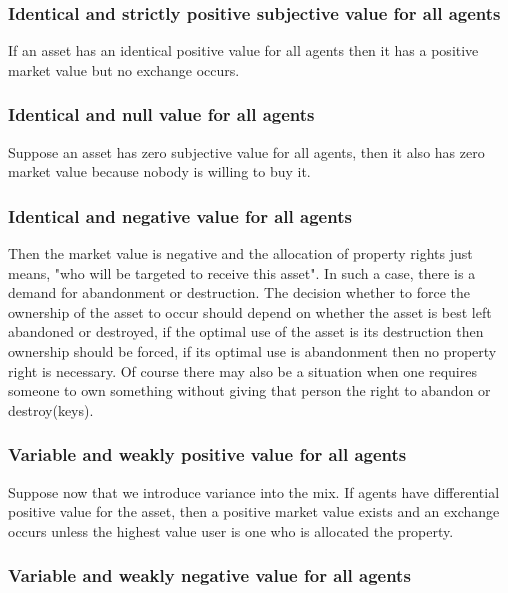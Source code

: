 \documentclass[12pt]{article}
\numberwithin{equation}{section}
\begin{document}
\subsubsection{Identical and strictly positive subjective value for all agents}

If an asset has an identical positive value for all agents then it has a positive market value but no exchange occurs. 

\subsubsection{Identical and null value for all agents}

Suppose an asset has zero subjective value for all agents, then it also has zero market value because nobody is willing to buy it. 

\subsubsection{Identical and negative value for all agents}

Then the market value is negative and the allocation of property rights just means,  "who will be targeted to receive this asset". In such a case, there is a demand for abandonment or destruction. The decision whether to force the ownership of the asset to occur should depend on whether the asset is best left abandoned or destroyed, if the optimal use of the asset is its destruction then ownership should be forced, if its optimal use is abandonment then no property right is necessary. Of course there may also be a situation when one requires someone to own something without giving that person the right to abandon or destroy(keys). 

\subsubsection{Variable and weakly positive value for all agents}

Suppose now that we introduce variance into the mix. If agents have differential positive value for the asset, then a positive market value exists and an exchange occurs unless the highest value user is one who is allocated the property.

\subsubsection{Variable and weakly negative value for all agents}
\end{document}
